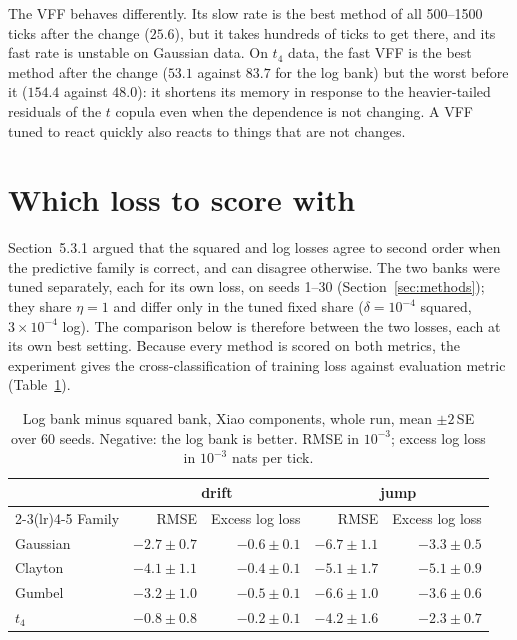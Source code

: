 The VFF behaves differently. Its slow rate is the best method of all 500--1500 ticks after the
change ($25.6$), but it takes hundreds of ticks to get there, and its fast rate is unstable on
Gaussian data. On $t_4$ data, the fast VFF is the best method after the change
($53.1$ against $83.7$ for the log bank) but the worst before it ($154.4$ against $48.0$): it
shortens its memory in response to the heavier-tailed residuals of the $t$ copula even when the
dependence is not changing. A VFF tuned to react quickly also reacts to things that are not
changes.

\section{Which loss to score with}
\label{sec:loss}

Section~5.3.1 argued that the squared and log losses agree to second order when the predictive
family is correct, and can disagree otherwise. The two banks were tuned separately, each for its
own loss, on seeds 1--30 (Section~\ref{sec:methods}); they share $\eta=1$ and differ only in the
tuned fixed share ($\delta=10^{-4}$ squared, $3\times10^{-4}$ log). The comparison below is
therefore between the two losses, each at its own best setting. Because every method is scored on
both metrics, the experiment gives the cross-classification of training loss against evaluation
metric (Table~\ref{tab:loss}).

\begin{table}[ht]
  \centering
  \caption{Log bank minus squared bank, Xiao components, whole run, mean $\pm2$\,SE over 60 seeds.
    Negative: the log bank is better. RMSE in $10^{-3}$; excess log loss in $10^{-3}$ nats per tick.}
  \label{tab:loss}
  \small
  \begin{tabular}{lrrrr}
    \toprule
    & \multicolumn{2}{c}{drift} & \multicolumn{2}{c}{jump} \\
    \cmidrule(lr){2-3}\cmidrule(lr){4-5}
    Family & RMSE & Excess log loss & RMSE & Excess log loss \\
    \midrule
    Gaussian & $-2.7\pm0.7$ & $-0.6\pm0.1$ & $-6.7\pm1.1$ & $-3.3\pm0.5$ \\
    Clayton  & $-4.1\pm1.1$ & $-0.4\pm0.1$ & $-5.1\pm1.7$ & $-5.1\pm0.9$ \\
    Gumbel   & $-3.2\pm1.0$ & $-0.5\pm0.1$ & $-6.6\pm1.0$ & $-3.6\pm0.6$ \\
    $t_4$    & $-0.8\pm0.8$ & $-0.2\pm0.1$ & $-4.2\pm1.6$ & $-2.3\pm0.7$ \\
    \bottomrule
  \end{tabular}
\end{table}

